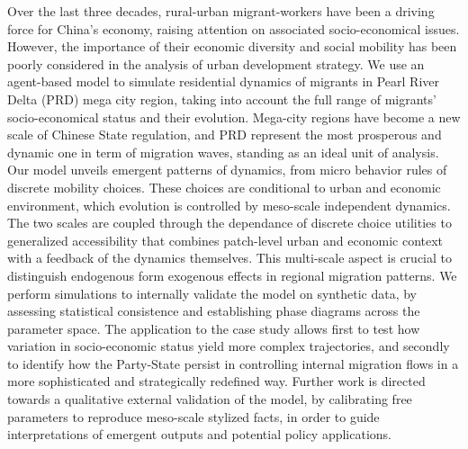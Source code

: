 Over the last three decades, rural-urban migrant-workers have been a driving force for China's economy, raising attention on associated socio-economical issues. However, the importance of their economic diversity and social mobility has been poorly considered in the analysis of urban development strategy.
We use an agent-based model to simulate residential dynamics of migrants in Pearl River Delta (PRD) mega city region, taking into account the full range of migrants’ socio-economical status and their evolution. Mega-city regions have become a new scale of Chinese State regulation, and PRD represent the most prosperous and dynamic one in term of migration waves, standing as an ideal unit of analysis.
Our model unveils emergent patterns of dynamics, from micro behavior rules of discrete mobility choices. These choices are conditional to urban and economic environment, which evolution is controlled by meso-scale independent dynamics.
The two scales are coupled through the dependance of discrete choice utilities to generalized accessibility that combines patch-level urban and economic context with a feedback of the dynamics themselves. This multi-scale aspect is crucial to distinguish endogenous form exogenous effects in regional migration patterns.
We perform simulations to internally validate the model on synthetic data, by assessing statistical consistence and establishing phase diagrams across the parameter space.
The application to the case study allows first to test how variation in socio-economic status yield more complex trajectories, and secondly to identify how the Party-State persist in controlling internal migration flows in a more sophisticated and strategically redefined way.
Further work is directed towards a qualitative external validation of the model, by calibrating free parameters to reproduce meso-scale stylized facts, in order to guide interpretations of emergent outputs and potential policy applications.

\bigskip


\bigskip







%
%



